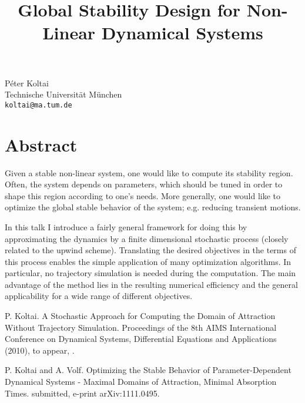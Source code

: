 \title{Global Stability Design for Non-Linear Dynamical Systems}
 \author{} \institute{}
\maketitle
\begin{center}
{\large P\'eter Koltai}\\
Technische Universit\"at  M\"unchen\\
{\tt koltai@ma.tum.de}

\end{center}

\section*{Abstract}

Given a stable non-linear system, one would like to compute its stability region. Often, the system depends on parameters, which should be tuned in order to shape this region according to one's needs. More generally, one would like to optimize the global stable behavior of the system; e.g. reducing transient motions.

In this talk I introduce a fairly general framework for doing this by approximating the dynamics by a finite dimensional stochastic process (closely related to the upwind scheme). Translating the desired objectives in the terms of this process enables the simple application of many optimization algorithms. In particular, no trajectory simulation is needed during the computation. The main advantage of the method lies in the resulting numerical efficiency and the general applicability for a wide range of different objectives.


\begin{thebibliography}{10}

{\sc P. Koltai}. {A Stochastic Approach for Computing the Domain of Attraction Without Trajectory Simulation}. Proceedings of the 8th AIMS International Conference on Dynamical Systems, Differential Equations and Applications (2010), to appear, .



{\sc P. Koltai and A. Volf}. {Optimizing the Stable Behavior of Parameter-Dependent Dynamical Systems - Maximal Domains of Attraction, Minimal Absorption Times}. submitted, e-print arXiv:1111.0495.

\end{thebibliography}
